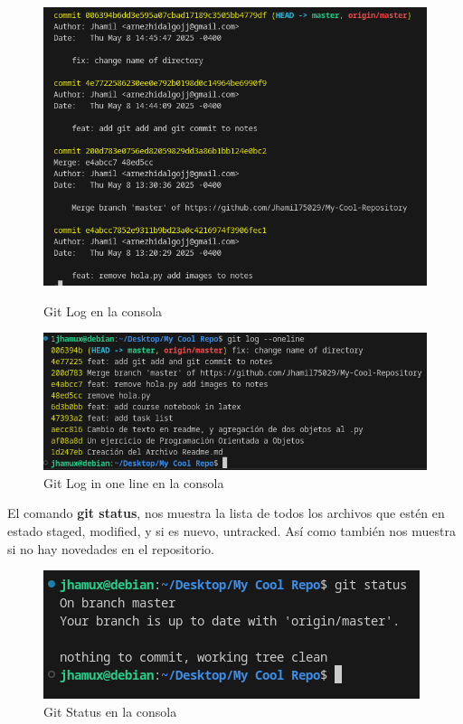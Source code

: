 \documentclass[13pt]{article}
\begin{document}
\begin{figure}[!h]
	\centering
	\includegraphics[scale = 0.4]{Images/gitlog1.png}
	\caption {\small Git Log en la consola}
	
	\includegraphics[scale = 0.4]{Images/gitlog2.png}
	\caption {\small Git Log in one line en la consola}
\end{figure}

El comando \textbf{git status}, nos muestra la lista de todos los archivos que estén en estado staged, modified, y si es nuevo, untracked. Así como también nos muestra si no hay novedades en el repositorio.\\

\begin{figure}[!h]
	\centering
	\includegraphics[scale = 0.7]{Images/gitstatus.png}
	\caption {\small Git Status en la consola}
\end{figure}
\end{document}
